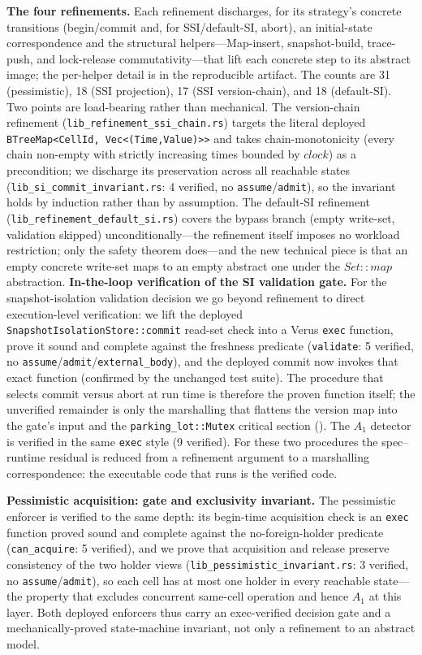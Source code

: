 \documentclass[journal,compsoc,10pt]{IEEEtran}
\theoremstyle{definition}
\theoremstyle{remark}
\newcommand{\fld}[1]{\mathit{#1}}
\begin{document}
\medskip
\noindent\textbf{The four refinements.}
Each refinement discharges, for its strategy's concrete transitions
(begin/commit and, for SSI/default-SI, abort), an initial-state
correspondence and the structural helpers---Map-insert, snapshot-build,
trace-push, and lock-release commutativity---that lift each concrete step
to its abstract image; the per-helper detail is in the reproducible
artifact. The counts are 31 (pessimistic), 18 (SSI projection), 17 (SSI
version-chain), and 18 (default-SI). Two points are load-bearing rather
than mechanical. The version-chain refinement
(\texttt{lib\_refinement\_ssi\_chain.rs}) targets the literal deployed
\texttt{BTreeMap<CellId, Vec<(Time,Value)>>} and takes chain-monotonicity
(every chain non-empty with strictly increasing times bounded by
$\fld{clock}$) as a precondition; we discharge its preservation across all
reachable states (\texttt{lib\_si\_commit\_invariant.rs}: 4 verified, no
\texttt{assume}/\texttt{admit}), so the invariant holds by induction rather
than by assumption. The default-SI refinement
(\texttt{lib\_refinement\_default\_si.rs}) covers the bypass branch
(empty write-set, validation skipped) unconditionally---the refinement
itself imposes no workload restriction; only the safety theorem does---and
the new technical piece is that an empty concrete write-set maps to an
empty abstract one under the $\fld{Set::map}$ abstraction.
\noindent\textbf{In-the-loop verification of the SI validation gate.}
For the snapshot-isolation validation decision we go beyond
refinement to direct execution-level verification: we lift the deployed
\texttt{SnapshotIsolationStore::commit} read-set check into a Verus
\texttt{exec} function, prove it sound and complete against the freshness
predicate (\texttt{validate}: 5 verified, no
\texttt{assume}/\texttt{admit}/\texttt{external\_body}), and the deployed
commit now invokes that exact function (confirmed by the unchanged test
suite). The procedure that selects commit versus abort at run time is
therefore the proven function itself; the unverified remainder is only the
marshalling that flattens the version map into the gate's input and the
\texttt{parking\_lot::Mutex} critical section
(). The $A_1$ detector is verified in the
same \texttt{exec} style (9 verified). For these two procedures the
spec--runtime residual is reduced from a refinement argument to a
marshalling correspondence: the executable code that runs is the verified
code.

\medskip
\noindent\textbf{Pessimistic acquisition: gate and exclusivity invariant.}
The pessimistic enforcer is verified to the same depth: its begin-time
acquisition check is an \texttt{exec} function proved sound and complete
against the no-foreign-holder predicate (\texttt{can\_acquire}: 5
verified), and we prove that acquisition and release preserve consistency
of the two holder views (\texttt{lib\_pessimistic\_invariant.rs}: 3
verified, no \texttt{assume}/\texttt{admit}), so each cell has at most one
holder in every reachable state---the property that excludes concurrent
same-cell operation and hence $A_1$ at this layer. Both deployed enforcers
thus carry an exec-verified decision gate and a mechanically-proved
state-machine invariant, not only a refinement to an abstract model.
\end{document}
